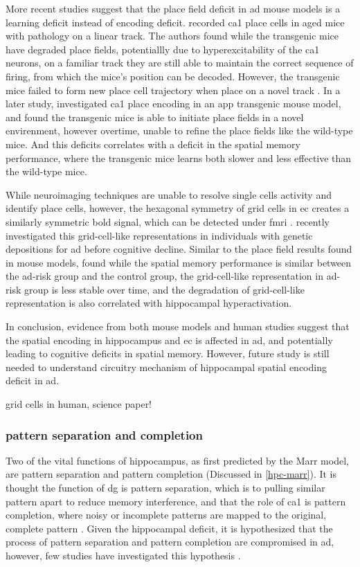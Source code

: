 More recent studies suggest that the place field deficit in \gls{ad} mouse models is a learning deficit instead of encoding deficit. \citet{cheng13} recorded \gls{ca1} place cells in aged mice with \atau pathology on a linear track. The authors found while the transgenic mice have degraded place fields, potentiallly due to hyperexcitability of the \gls{ca1} neurons, on a familiar track they are still able to maintain the correct sequence of firing, from which the mice's position can be decoded. However, the transgenic mice failed to form new place cell trajectory when place on a novel track \citep{cheng13}. In a later study, \citet{zhao14} investigated \gls{ca1} place encoding in an \gls{app} transgenic mouse model, and found the transgenic mice is able to initiate place fields in a novel envirenment, however overtime, unable to refine the place fields like the wild-type mice. And this deficits correlates with a deficit in the spatial memory performance, where the transgenic mice learns both slower and less effective than the wild-type mice.

While neuroimaging techniques are unable to resolve single cells activity and identify place cells, however, the hexagonal symmetry of grid cells in \gls{ec} creates a similarly symmetric \gls{bold} signal, which can be detected under \gls{fmri} \citep{doeller10}. \citet{kunz15} recently investigated this grid-cell-like representations in individuals with genetic depositions for \gls{ad} before cognitive decline. Similar to the place field results found in mouse models, \citet{kunz15} found while the spatial memory performance is similar between the \gls{ad}-risk group and the control group, the grid-cell-like representation in \gls{ad}-risk group is less stable over time, and the degradation of grid-cell-like representation is also correlated with hippocampal hyperactivation. 

In conclusion, evidence from both mouse models and human studies suggest that the spatial encoding in hippocampus and \gls{ec} is affected in \gls{ad}, and potentially leading to cognitive deficits in spatial memory. However, future study is still needed to understand circuitry mechanism of hippocampal spatial encoding deficit in \gls{ad}.


\citep{cacucci08}
\citep{cheng13}
\citep{zhao14}
\citep{kunz15} grid cells in human, science paper!
\subsubsection{pattern separation and completion}
Two of the vital functions of hippocampus, as first predicted by the Marr model, are pattern separation and pattern completion (Discussed in \ref{hpc-marr}). It is thought the function of \gls{dg} is pattern separation, which is to pulling similar pattern apart to reduce memory interference, and that the role of \gls{ca1} is pattern completion, where noisy or incomplete patterns are mapped to the original, complete pattern . Given the hippocampal deficit, it is hypothesized that the process of pattern separation and pattern completion are compromised in \gls{ad}, however, few studies have investigated this hypothesis \citep{maruszak14}. 

